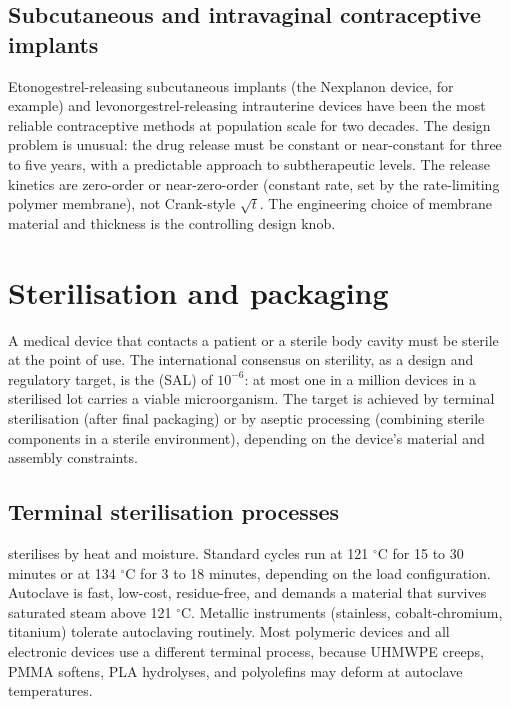 \subsection{Subcutaneous and intravaginal contraceptive implants}

Etonogestrel-releasing subcutaneous implants (the Nexplanon device,
for example) and levonorgestrel-releasing intrauterine devices
have been the most reliable contraceptive methods at population
scale for two decades. The design problem is unusual: the drug
release must be constant or near-constant for three to five years,
with a predictable approach to subtherapeutic levels. The release
kinetics are zero-order or near-zero-order (constant rate, set by
the rate-limiting polymer membrane), not Crank-style $\sqrt{t}$.
The engineering choice of membrane material and thickness is the
controlling design knob.

\section{Sterilisation and packaging}


A medical device that contacts a patient or a sterile body cavity
must be sterile at the point of use. The international consensus
on sterility, as a design and regulatory target, is the
 (SAL) of $10^{-6}$: at most
one in a million devices in a sterilised lot carries a viable
microorganism. The target is achieved by terminal sterilisation
(after final packaging) or by aseptic processing (combining
sterile components in a sterile environment), depending on the
device's material and assembly constraints.

\subsection{Terminal sterilisation processes}

 sterilises by heat and
moisture. Standard cycles run at 121 $^{\circ}$C for 15 to 30
minutes or at 134 $^{\circ}$C for 3 to 18 minutes, depending on
the load configuration. Autoclave is fast, low-cost, residue-free,
and demands a material that survives saturated steam above 121
$^{\circ}$C. Metallic instruments (stainless, cobalt-chromium,
titanium) tolerate autoclaving routinely. Most polymeric devices
and all electronic devices use a different terminal process,
because UHMWPE creeps, PMMA softens, PLA hydrolyses, and
polyolefins may deform at autoclave temperatures.

